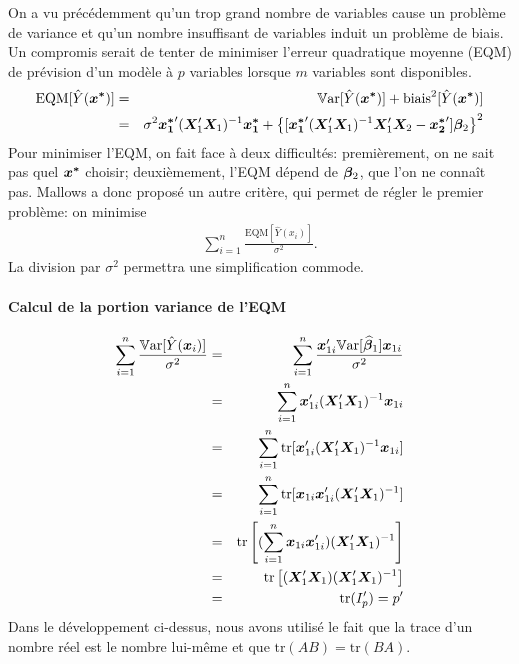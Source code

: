 On a vu précédemment qu'un trop grand nombre de variables cause un problème de variance et qu'un nombre insuffisant de variables induit un problème de biais. Un compromis serait de tenter de minimiser l'erreur quadratique moyenne (EQM) de prévision d'un modèle à $p$ variables lorsque $m$ variables sont disponibles.
\begin{eqnarray*}
  \mbox{EQM}[\hat{Y}({\bm{x^*}})] &=& \mathbb{V}\text{ar}[\hat{Y}({\bm{x^*}})] + \mbox{biais}^2[\hat{Y}({\bm{x^*}})] \\
  &=& \sigma^2{\bm{x_1^*}}'(\bm{X}_1'\bm{X}_1)^{-1}{\bm{x_1^*}} + \left\{[{{\bm{x_1^*}}'(\bm{X}_1'\bm{X}_1)^{-1}\bm{X}_1' \bm{X}_2}-{\bm{x_2^*}}']\bm\beta_2\right\}^2
\end{eqnarray*}
Pour minimiser l'EQM, on fait face à deux difficultés: premièrement,  on ne sait pas quel ${\bm{x^*}}$ choisir; deuxièmement, l'EQM dépend de $\bm\beta_2$, que l'on ne connaît pas. Mallows a donc proposé un autre critère, qui permet de régler le premier problème: on minimise
\begin{eqnarray*}
  \sum_{i=1}^n \frac{\text{EQM}[\hat{Y}(x_i)]}{\sigma^2}.
\end{eqnarray*}
La division par $\sigma^2$ %
permettra une simplification commode.

\paragraph{Calcul de la portion variance de l'EQM}
\begin{eqnarray*}
  \sum_{i=1}^n \frac{\mathbb{V}\text{ar}[\hat{Y}({\bm{x}}_i)]}{\sigma^2} &=& \sum_{i=1}^n \frac{{\bm{x}}_{1i}' \mathbb{V}\text{ar}[\widehat{\bm\beta}_1] {\bm{x}}_{1i}}{\sigma^2} \\
  &=& \sum_{i=1}^n {\bm{x}}_{1i}' (\bm{X}_1' \bm{X}_1)^{-1} {\bm{x}}_{1i} \\
  &=& \sum_{i=1}^n \mbox{tr}[{\bm{x}}_{1i}' (\bm{X}_1'\bm{X}_1)^{-1} {\bm{x}}_{1i}]  \\
  &=& \sum_{i=1}^n \mbox{tr}[{\bm{x}}_{1i} {\bm{x}}_{1i}' (\bm{X}_1'\bm{X}_1)^{-1}] \\
  &=& \mbox{tr}\left[(\sum_{i=1}^n {\bm{x}}_{1i}{\bm{x}}_{1i}') (\bm{X}_1' \bm{X}_1)^{-1}\right] \\
  &=& \mbox{tr}\left[(\bm{X}_1'\bm{X}_1)(\bm{X}_1'\bm{X}_1)^{-1}\right] \\
  &=& \mbox{tr}(I_p')=p'
\end{eqnarray*}
Dans le développement ci-dessus, nous avons utilisé le fait que la trace d'un nombre réel est le nombre lui-même et que $\mbox{tr}(AB)=\mbox{tr}(BA).$

